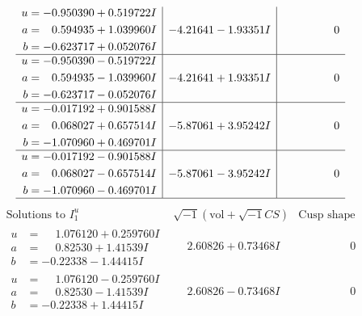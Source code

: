 \documentclass[1p]{elsarticle_modified}
\theoremstyle{definition}
\newcommand{\I}{\sqrt{-1}}
\begin{document}
$$\begin{array}{c|c|c}
\begin{aligned}
u &= -0.950390 + 0.519722 I \\
a &= \phantom{-}0.594935 + 1.039960 I \\
b &= -0.623717 + 0.052076 I\end{aligned}
 & -4.21641 - 1.93351 I & \phantom{-0.000000 } 0 \\ \hline\begin{aligned}
u &= -0.950390 - 0.519722 I \\
a &= \phantom{-}0.594935 - 1.039960 I \\
b &= -0.623717 - 0.052076 I\end{aligned}
 & -4.21641 + 1.93351 I & \phantom{-0.000000 } 0 \\ \hline\begin{aligned}
u &= -0.017192 + 0.901588 I \\
a &= \phantom{-}0.068027 + 0.657514 I \\
b &= -1.070960 + 0.469701 I\end{aligned}
 & -5.87061 + 3.95242 I & \phantom{-0.000000 } 0 \\ \hline\begin{aligned}
u &= -0.017192 - 0.901588 I \\
a &= \phantom{-}0.068027 - 0.657514 I \\
b &= -1.070960 - 0.469701 I\end{aligned}
 & -5.87061 - 3.95242 I & \phantom{-0.000000 } 0\\
 \hline 
 \end{array}$$\newpage$$\begin{array}{c|c|c}  
\text{Solutions to }I^u_{1}& \I (\text{vol} + \sqrt{-1}CS) & \text{Cusp shape}\\
 \hline 
\begin{aligned}
u &= \phantom{-}1.076120 + 0.259760 I \\
a &= \phantom{-}0.82530 + 1.41539 I \\
b &= -0.22338 - 1.44415 I\end{aligned}
 & \phantom{-}2.60826 + 0.73468 I & \phantom{-0.000000 } 0 \\ \hline\begin{aligned}
u &= \phantom{-}1.076120 - 0.259760 I \\
a &= \phantom{-}0.82530 - 1.41539 I \\
b &= -0.22338 + 1.44415 I\end{aligned}
 & \phantom{-}2.60826 - 0.73468 I & \phantom{-0.000000 } 0 \\ \hline\begin{aligned}

\end{aligned}
\end{array}$$
\end{document}
